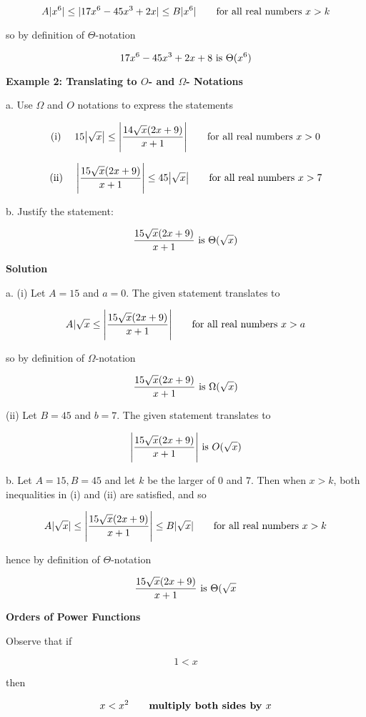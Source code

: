 $$A|x^6|\leq|17x^6-45x^3+2x|\leq B|x^6|\qquad\hbox{for all real numbers $x>k$}$$

so by definition of $\Theta$-notation

$$17x^6-45x^3+2x+8\hbox{ is }\Theta(x^6)$$

\filbreak
\vskip 1cm
{\bf Example 2: Translating to $O$- and $\Omega$- Notations}

\vskip 1mm
a. Use $\Omega$ and $O$ notations to express the statements

$$\hbox{\rm (i) }\quad 15\bigl|\sqrt{x}\bigr|\leq\Biggl|{14\sqrt{x}(2x+9)\over x+1}\Biggr|\qquad\hbox{for all real numbers $x>0$}$$

$$\hbox{\rm (ii) }\quad \Biggl|{15\sqrt{x}(2x+9)\over x+1}\Biggr|\leq 45\bigl|\sqrt{x}\bigr|\qquad\hbox{for all real numbers $x>7$}$$

\vskip 2mm
b. Justify the statement:

$${15\sqrt{x}(2x+9)\over x+1}\hbox{ is } \Theta(\sqrt{x})$$

\vskip 3mm
{\bf Solution}

\vskip 1mm
a. {\rm (i)} Let $A=15$ and $a=0$. The given statement translates to

$$A|\sqrt{x}\leq \Biggl|{15\sqrt{x}(2x+9)\over x+1}\Biggr|\qquad\hbox{for all real numbers $x>a$}$$

so by definition of $\Omega$-notation

$${15\sqrt{x}(2x+9)\over x+1}\hbox{ is }\Omega(\sqrt{x})$$

\vskip 3mm
{\rm (ii)} Let $B=45$ and $b=7$. The given statement translates to

$$\Biggl|{15\sqrt{x}(2x+9)\over x+1}\Biggr|\hbox{ is } O(\sqrt{x})$$

\vskip 3mm
b. Let $A=15, B=45$ and let $k$ be the larger of $0$ and $7$. Then when $x>k$, both inequalities in {\rm (i)} and {\rm (ii)} are satisfied, and so

$$A|\sqrt{x}|\leq \Biggl|{15\sqrt{x}(2x+9)\over x+1}\Biggr| \leq B|\sqrt{x}|\qquad\hbox{for all real numbers $x>k$}$$

hence by definition of $\Theta$-notation

$${15\sqrt{x}(2x+9)\over x+1}\hbox{ is } \Theta(\sqrt{x}$$

\filbreak
\vskip 1cm
{\bf Orders of Power Functions}

\vskip 1mm
Observe that if

$$1<x$$

then

$$x<x^2\qquad\hbox{\bf multiply both sides by $x$}$$

